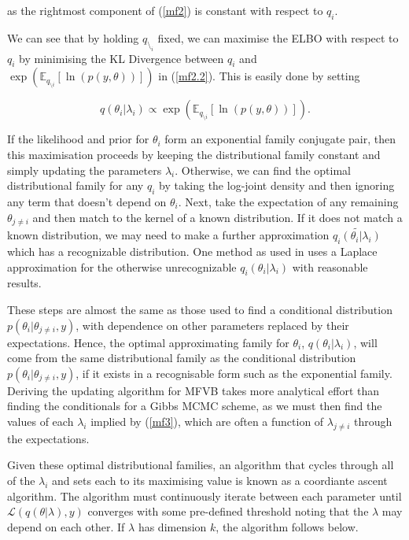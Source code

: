 \documentclass{article}\usepackage[]{graphicx}\usepackage[]{color}
\numberwithin{equation}{section}
\begin{document}
as the rightmost component of (\ref{mf2}) is constant with respect to $q_i$.

We can see that by holding $q_{\setminus_i}$ fixed, we can maximise the ELBO with respect to $q_i$ by minimising the KL Divergence between $q_i$ and $\exp( \mathbb{E}_{q_{\setminus i}} [\ln(p(y,\theta))])$ in (\ref{mf2.2}). This is easily done by setting

\begin{equation}
\label{mf3}
q(\theta_i | \lambda_i) \propto\exp( \mathbb{E}_{q_{\setminus i}} [\ln(p(y,\theta))]).
\end{equation}

If the likelihood and prior for $\theta_i$ form an exponential family conjugate pair, then this maximisation proceeds by keeping the distributional family constant and simply updating the parameters $\lambda_i$. Otherwise, we can find the optimal distributional family for any $q_i$ by taking the log-joint density and then ignoring any term that doesn't depend on $\theta_i$. Next, take the expectation of any remaining $\theta_{j \neq i}$ and then match to the kernel of a known distribution. If it does not match a known distribution, we may need to make a further approximation $\tilde{q_i(\theta_i|\lambda_i)}$ which has a recognizable distribution. One method as used in \citet{Friston2006} uses a Laplace approximation for the otherwise unrecognizable $q_i(\theta_i | \lambda_i)$ with reasonable results.

These steps are almost the same as those used to find a conditional distribution $p(\theta_i | \theta_{j \neq i}, y)$, with dependence on other parameters replaced by their expectations. Hence, the optimal approximating family for $\theta_i$, $q(\theta_i | \lambda_i)$, will come from the same distributional family as the conditional distribution $p(\theta_i | \theta_{j \neq i}, y)$, if it exists in a recognisable form such as the exponential family. Deriving the updating algorithm for MFVB takes more analytical effort than finding the conditionals for a Gibbs MCMC scheme, as we must then find the values of each $\lambda_i$ implied by (\ref{mf3}), which are often a function of $\lambda_{j \neq i}$ through the expectations.
\vspace{5mm}

Given these optimal distributional families, an algorithm that cycles through all of the $\lambda_i$ and sets each to its maximising value is known as a coordiante ascent algorithm. The algorithm must continuously iterate between each parameter until $\mathcal{L}(q(\theta | \lambda), y)$ converges with some pre-defined threshold noting that the $\lambda$ may depend on each other. If $\lambda$ has dimension $k$, the algorithm follows below.
\end{document}
